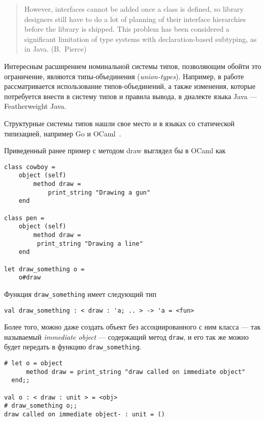 \begin{quote}
However, interfaces cannot be added once a class is defined, so library
designers still have to do a lot of planning of their interface hierarchies
before the library is shipped. This problem has been considered a significant
limitation of type systems with declaration-based subtyping, as in Java.
(B.~Pierce)
\end{quote}

Интересным расширением номинальной системы типов, позволяющим обойти это
ограничение, являются типы-объединения (\emph{union-types}). Например, в
работе~\cite{Igarashi2006} рассматривается использование типов-объединений, а
также изменения, которые потребуется внести в систему типов и правила вывода, в
диалекте языка Java --- Featherweight Java.

Структурные системы типов нашли свое место и в языках со статической
типизацией, например Go и OCaml~\cite[с.~33]{Ocaml}.

Приведенный ранее пример с методом draw выглядел бы в OCaml как

\lstset{language=[Objective]Caml}
\begin{lstlisting}
class cowboy =
    object (self)
        method draw =
            print_string "Drawing a gun"
    end

class pen = 
    object (self) 
        method draw =
         print_string "Drawing a line"
    end

let draw_something o =
    o#draw

\end{lstlisting}

Функция \texttt{draw\_something} имеет следующий тип

\begin{lstlisting}
val draw_something : < draw : 'a; .. > -> 'a = <fun>
\end{lstlisting}

Более того, можно даже создать объект без ассоциированного с ним класса --- так
называемый \emph{immediate object} --- содержащий метод \texttt{draw}, и его так же можно будет
передать в функцию \texttt{draw\_something}.

\begin{lstlisting}
# let o = object
      method draw = print_string "draw called on immediate object"
  end;;

val o : < draw : unit > = <obj>
# draw_something o;;
draw called on immediate object- : unit = ()
\end{lstlisting}
\lstset{language=Python}

